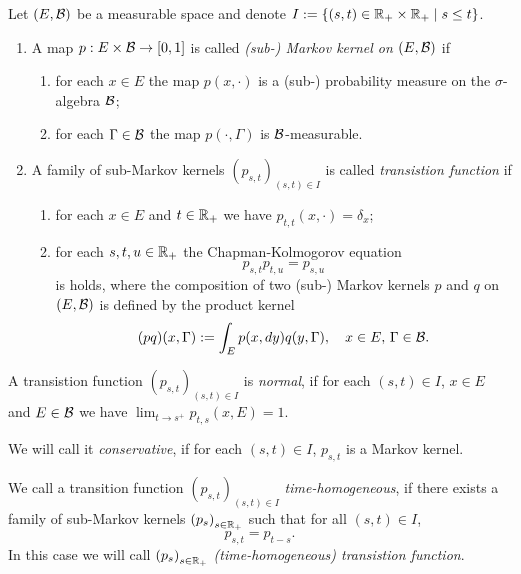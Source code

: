 \documentclass[../Master.tex]{subfiles}
\begin{document}
\begin{definition}\label{def:transion_functions}
  Let \((E,\mathcal{B})\) be a measurable space and denote \(I := \{(s,t) \in \mathbb{R}_+ \times \mathbb{R}_+ \mid s \le t \} \).
  \begin{enumerate}[label = (\roman*)]
    \item A map \(p: E \times \mathcal{B} \to [0,1]\) is called \textit{(sub-) Markov kernel on \((E,\mathcal{B})\)} if
    \begin{enumerate}[label = (\alph*)]
      \item for each \(x \in E \) the map \(p(x, \cdot) \) is a (sub-) probability measure on the \(\sigma \)-algebra \(\mathcal{B} \);
      \item for each \(\Gamma \in \mathcal{B} \) the map \(p(\cdot, \Gamma) \) is \(\mathcal{B} \)-measurable.
    \end{enumerate}
    \item A family of sub-Markov kernels \({(p_{s,t})}_{(s,t) \in I} \) is called \textit{transistion function} if
    \begin{enumerate}[label = (\alph*)]
      \item for each \(x \in E \) and \(t \in \mathbb{R}_+ \) we have  \(p_{t,t}(x, \cdot) = \delta_x \);
      \item for each \(s, t, u \in \mathbb{R}_+ \) the Chapman-Kolmogorov equation
      \begin{equation}\label{chapman_kolmogorov}
        p_{s,t}p_{t,u} = p_{s,u}
      \end{equation}
      is holds, where the composition of two (sub-) Markov kernels \(p\) and \(q\) on \((E,\mathcal{B})\) is defined by the product kernel
      \begin{equation*}
        (pq)(x, \Gamma) := \int_E p(x, dy) q(y, \Gamma), \quad x \in E, \, \Gamma \in \mathcal{B}.
      \end{equation*}
    \end{enumerate}
  \end{enumerate}

  A transistion function \({(p_{s,t})}_{(s,t) \in I} \) is \textit{normal}, if for each \((s,t) \in I \), \(x \in E\) and \(E \in \mathcal{B} \) we have \(\lim_{t \to s^+} p_{t,s}(x, E) = 1\).

  We will call it \textit{conservative}, if for each \((s,t) \in I \), \(p_{s,t}\) is a Markov kernel.

  We call a transition function \({(p_{s,t})}_{(s,t) \in I} \) \textit{time-homogeneous}, if there exists a family of sub-Markov kernels \({(p_s)}_{s \in \mathbb{R}_+}\) such that for all \((s,t) \in I \),
  \begin{equation*}
    p_{s,t} = p_{t-s}.
  \end{equation*}
  In this case we will call \({(p_s)}_{s \in \mathbb{R}_+}\) \textit{(time-homogeneous) transistion function}.
\end{definition}
\end{document}
